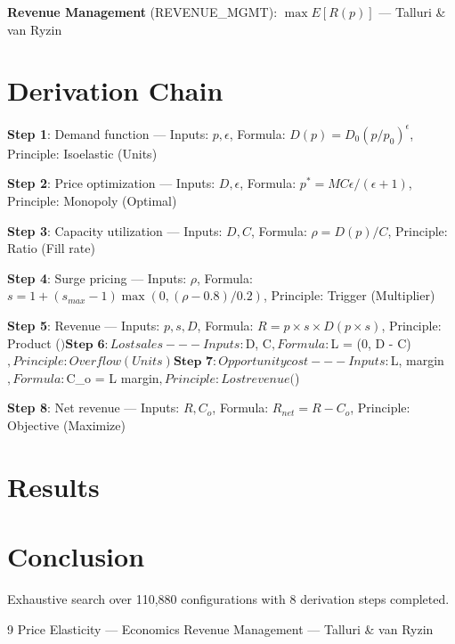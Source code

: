 \documentclass[11pt,twocolumn]{article}
\begin{document}
\textbf{Revenue Management} (REVENUE_MGMT): $\max E[R(p)]$ --- Talluri & van Ryzin


\section{Derivation Chain}
\textbf{Step 1}: Demand function --- Inputs: $p, \epsilon$, Formula: $D(p) = D_0 (p/p_0)^\epsilon$, Principle: Isoelastic (Units)


\textbf{Step 2}: Price optimization --- Inputs: $D, \epsilon$, Formula: $p^* = MC \epsilon/(\epsilon + 1)$, Principle: Monopoly (Optimal)


\textbf{Step 3}: Capacity utilization --- Inputs: $D, C$, Formula: $\rho = D(p)/C$, Principle: Ratio (Fill rate)


\textbf{Step 4}: Surge pricing --- Inputs: $\rho$, Formula: $s = 1 + (s_{max}-1)\max(0, (\rho-0.8)/0.2)$, Principle: Trigger (Multiplier)


\textbf{Step 5}: Revenue --- Inputs: $p, s, D$, Formula: $R = p \times s \times D(p \times s)$, Principle: Product ($)


\textbf{Step 6}: Lost sales --- Inputs: $D, C$, Formula: $L = \max(0, D - C)$, Principle: Overflow (Units)


\textbf{Step 7}: Opportunity cost --- Inputs: $L, margin$, Formula: $C_o = L \times margin$, Principle: Lost revenue ($)


\textbf{Step 8}: Net revenue --- Inputs: $R, C_o$, Formula: $R_{net} = R - C_o$, Principle: Objective (Maximize)


\section{Results}
\begin{table}[h]
\centering
\caption{Optimal Configuration}
\end{table}

\section{Conclusion}
Exhaustive search over 110,880 configurations with 8 derivation steps completed.

\begin{thebibliography}{9}
 Price Elasticity --- Economics
 Revenue Management --- Talluri & van Ryzin
\end{thebibliography}
\end{document}
